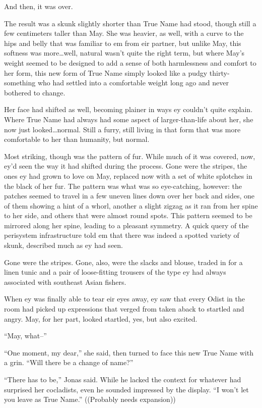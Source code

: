 And then, it was over.

The result was a skunk slightly shorter than True Name had stood, though still a few centimeters taller than May. She was heavier, as well, with a curve to the hips and belly that was familiar to em from eir partner, but unlike May, this softness was more\ldots well, natural wasn't quite the right term, but where May's weight seemed to be designed to add a sense of both harmlessness and comfort to her form, this new form of True Name simply looked like a pudgy thirty-something who had settled into a comfortable weight long ago and never bothered to change.

Her face had shifted as well, becoming plainer in ways ey couldn't quite explain. Where True Name had always had some aspect of larger-than-life about her, she now just looked\ldots normal. Still a furry, still living in that form that was more comfortable to her than humanity, but normal.

Most striking, though was the pattern of fur. While much of it was covered, now, ey'd seen the way it had shifted during the process. Gone were the stripes, the ones ey had grown to love on May, replaced now with a set of white splotches in the black of her fur. The pattern was what was so eye-catching, however: the patches seemed to travel in a few uneven lines down over her back and sides, one of them showing a hint of a whorl, another a slight zigzag as it ran from her spine to her side, and others that were almost round spots. This pattern seemed to be mirrored along her spine, leading to a pleasant symmetry. A quick query of the perisystem infrastructure told em that there was indeed a spotted variety of skunk, described much as ey had seen.

Gone were the stripes. Gone, also, were the slacks and blouse, traded in for a linen tunic and a pair of loose-fitting trousers of the type ey had always associated with southeast Asian fishers.

When ey was finally able to tear eir eyes away, ey saw that every Odist in the room had picked up expressions that verged from taken aback to startled and angry. May, for her part, looked startled, yes, but also excited.

``May, what--''

``One moment, my dear,'' she said, then turned to face this new True Name with a grin. ``Will there be a change of name?''

``There has to be,'' Jonas said. While he lacked the context for whatever had surprised her cocladists, even he sounded impressed by the display. ``I won't let you leave as True Name.'' ((Probably needs expansion))

